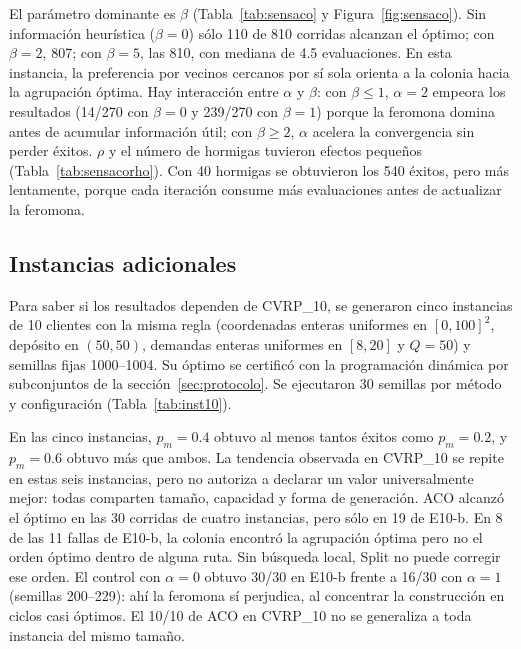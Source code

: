 \documentclass[11pt,a4paper]{article}
\numberwithin{equation}{section}
\begin{document}
El parámetro dominante es \(\beta\) (Tabla~\ref{tab:sensaco} y Figura~\ref{fig:sensaco}). Sin información heurística (\(\beta=0\)) sólo 110 de 810 corridas alcanzan el óptimo; con \(\beta=2\), 807; con \(\beta=5\), las 810, con mediana de 4.5 evaluaciones. En esta instancia, la preferencia por vecinos cercanos por sí sola orienta a la colonia hacia la agrupación óptima. Hay interacción entre \(\alpha\) y \(\beta\): con \(\beta\le1\), \(\alpha=2\) empeora los resultados (14/270 con \(\beta=0\) y 239/270 con \(\beta=1\)) porque la feromona domina antes de acumular información útil; con \(\beta\ge2\), \(\alpha\) acelera la convergencia sin perder éxitos. \(\rho\) y el número de hormigas tuvieron efectos pequeños (Tabla~\ref{tab:sensacorho}). Con 40 hormigas se obtuvieron los 540 éxitos, pero más lentamente, porque cada iteración consume más evaluaciones antes de actualizar la feromona.

\begin{table}[H]\centering\small
\caption{ACO en CVRP\_10: efecto de \(\rho\) y del número de hormigas con \(\beta\in\{1,2\}\) (540 corridas por nivel).}\label{tab:sensacorho}

\end{table}

\subsection{Instancias adicionales}\label{sec:instancias}

Para saber si los resultados dependen de CVRP\_10, se generaron cinco instancias de 10 clientes con la misma regla (coordenadas enteras uniformes en \([0,100]^2\), depósito en \((50,50)\), demandas enteras uniformes en \([8,20]\) y \(Q=50\)) y semillas fijas 1000--1004. Su óptimo se certificó con la programación dinámica por subconjuntos de la sección~\ref{sec:protocolo}. Se ejecutaron 30 semillas por método y configuración (Tabla~\ref{tab:inst10}).

\begin{table}[H]\centering\small
\caption{Instancias adicionales de 10 clientes con óptimo certificado (30 semillas, 2,000 evaluaciones).}\label{tab:inst10}

\end{table}

En las cinco instancias, \(p_m=0.4\) obtuvo al menos tantos éxitos como \(p_m=0.2\), y \(p_m=0.6\) obtuvo más que ambos. La tendencia observada en CVRP\_10 se repite en estas seis instancias, pero no autoriza a declarar un valor universalmente mejor: todas comparten tamaño, capacidad y forma de generación. ACO alcanzó el óptimo en las 30 corridas de cuatro instancias, pero sólo en 19 de E10-b. En 8 de las 11 fallas de E10-b, la colonia encontró la agrupación óptima pero no el orden óptimo dentro de alguna ruta. Sin búsqueda local, Split no puede corregir ese orden. El control con \(\alpha=0\) obtuvo 30/30 en E10-b frente a 16/30 con \(\alpha=1\) (semillas 200--229): ahí la feromona sí perjudica, al concentrar la construcción en ciclos casi óptimos. El 10/10 de ACO en CVRP\_10 no se generaliza a toda instancia del mismo tamaño.
\end{document}
